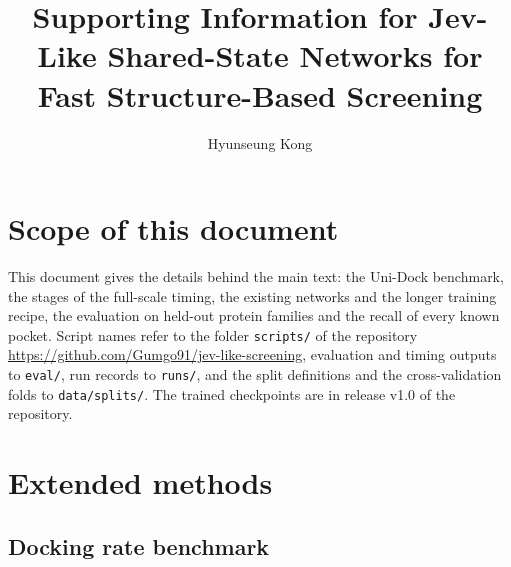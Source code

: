 \documentclass[journal=jcisd8,manuscript=article]{achemso}
\author{Hyunseung Kong}
\affiliation{Interdisciplinary Program in Bioinformatics, Seoul National University, Seoul 08826, Republic of Korea}
\title{Supporting Information for Jev-Like Shared-State Networks for Fast Structure-Based Screening}
\begin{document}
\maketitle

\section*{Scope of this document}

This document gives the details behind the main text: the Uni-Dock benchmark, the stages of the full-scale timing, the existing networks and the longer training recipe, the evaluation on held-out protein families and the recall of every known pocket. Script names refer to the folder \texttt{scripts/} of the repository \url{https://github.com/Gumgo91/jev-like-screening}, evaluation and timing outputs to \texttt{eval/}, run records to \texttt{runs/}, and the split definitions and the cross-validation folds to \texttt{data/splits/}. The trained checkpoints are in release v1.0 of the repository.

\section{Extended methods}

\subsection{Docking rate benchmark}
\end{document}
